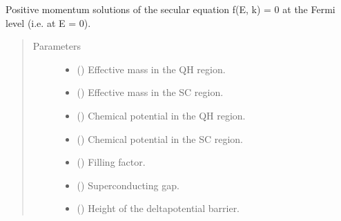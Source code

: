 \documentclass[letterpaper,10pt,english]{sphinxmanual}
\begin{document}

\begin{fulllineitems}
\label{\detokenize{modules:modules.functions.fermi_momenta}}
\pysigstartsignatures
{}
\pysigstopsignatures
\sphinxAtStartPar
Positive momentum solutions of the secular equation f(E, k) = 0 at the Fermi level (i.e. at E = 0).
\begin{quote}\begin{description}
\item[{Parameters}] \leavevmode\begin{itemize}
\item {} 
\sphinxAtStartPar
{} () \textendash{} Effective mass in the QH region.

\item {} 
\sphinxAtStartPar
{} () \textendash{} Effective mass in the SC region.

\item {} 
\sphinxAtStartPar
{} () \textendash{} Chemical potential in the QH region.

\item {} 
\sphinxAtStartPar
{} () \textendash{} Chemical potential in the SC region.

\item {} 
\sphinxAtStartPar
{} () \textendash{} Filling factor.

\item {} 
\sphinxAtStartPar
{} () \textendash{} Superconducting gap.

\item {} 
\sphinxAtStartPar
{} () \textendash{} Height of the delta\sphinxhyphen{}potential barrier.


\end{itemize}
\end{description}
\end{quote}
\end{fulllineitems}
\end{document}
